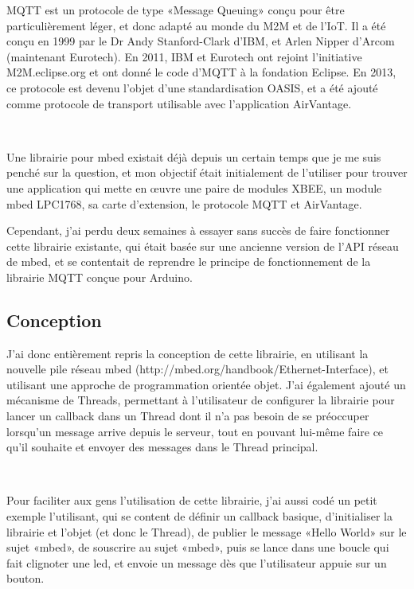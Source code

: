 \documentclass{article}
\begin{document}
MQTT est un protocole de type «Message Queuing» conçu pour être particulièrement léger, et donc adapté au monde du M2M et de l’IoT. Il a été conçu en 1999 par le Dr Andy Stanford-Clark d’IBM, et Arlen Nipper d’Arcom (maintenant Eurotech). En 2011, IBM et Eurotech ont rejoint l’initiative M2M.eclipse.org et ont donné le code d’MQTT à la fondation Eclipse. En 2013, ce protocole est devenu l’objet d’une standardisation OASIS, et a été ajouté comme protocole de transport utilisable avec l’application AirVantage.

~

Une librairie pour mbed existait déjà depuis un certain temps que je me suis penché sur la question, et mon objectif était initialement de l’utiliser pour trouver une application qui mette en œuvre une paire de modules XBEE, un module mbed LPC1768, sa carte d’extension, le protocole MQTT et AirVantage.

Cependant, j’ai perdu deux semaines à essayer sans succès de faire fonctionner cette librairie existante, qui était basée sur une ancienne version de l’API réseau de mbed, et se contentait de reprendre le principe de fonctionnement de la librairie MQTT conçue pour Arduino.

\subsection{Conception}

J’ai donc entièrement repris la conception de cette librairie, en utilisant la nouvelle pile réseau mbed (http://mbed.org/handbook/Ethernet-Interface), et utilisant une approche de programmation orientée objet. J’ai également ajouté un mécanisme de Threads, permettant à l’utilisateur de configurer la librairie pour lancer un callback dans un Thread dont il n’a pas besoin de se préoccuper lorsqu’un message arrive depuis le serveur, tout en pouvant lui-même faire ce qu’il souhaite et envoyer des messages dans le Thread principal.

~

Pour faciliter aux gens l’utilisation de cette librairie, j’ai aussi codé un petit exemple l’utilisant, qui se content de définir un callback basique, d’initialiser la librairie et l’objet (et donc le Thread), de publier le message «Hello World» sur le sujet «mbed», de souscrire au sujet «mbed», puis se lance dans une boucle qui fait clignoter une led, et envoie un message dès que l’utilisateur appuie sur un bouton.

~
\end{document}
